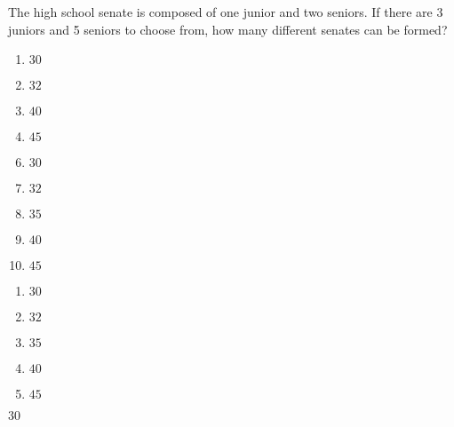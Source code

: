 



 The high school senate is composed of one junior and two seniors.  If there are 3 juniors and 5 seniors to choose from, how many different senates can be formed?


\ifsat
	\begin{enumerate}[label=\Alph*)]
		\item   $30$%
		\item  $32$
		\item $40$
		\item  $45$
	\end{enumerate}
\else
\fi

\ifacteven
	\begin{enumerate}[label=\textbf{\Alph*.},itemsep=\fill,align=left]
		\setcounter{enumii}{5}
		\item   $30$%
		\item  $32$
		\item $35$
		\addtocounter{enumii}{1}
		\item $40$
		\item  $45$
	\end{enumerate}
\else
\fi

\ifactodd
	\begin{enumerate}[label=\textbf{\Alph*.},itemsep=\fill,align=left]
		\item   $30$%
		\item  $32$
		\item $35$
		\item $40$
		\item  $45$
	\end{enumerate}
\else
\fi

\ifgridin
   $30$%
		
\else
\fi

